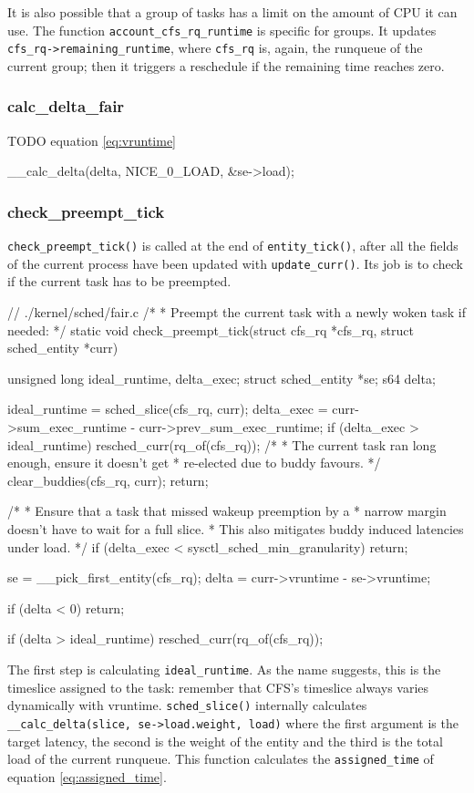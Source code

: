 It is also possible that a group of tasks has a limit on the amount of CPU it can use. The function \verb|account_cfs_rq_runtime| is specific for groups. It updates \verb|cfs_rq->remaining_runtime|, where \verb|cfs_rq| is, again, the runqueue of the current group; then it triggers a reschedule if the remaining time reaches zero.

\subsubsection{calc\_delta\_fair}TODO
equation \ref{eq:vruntime}
\begin{code}
__calc_delta(delta, NICE_0_LOAD, &se->load);
\end{code}
\subsubsection{check\_preempt\_tick} %

\verb|check_preempt_tick()| is called at the end of \verb|entity_tick()|, after all the fields of the current process have been updated with \verb|update_curr()|. Its job is to check if the current task has to be preempted. 
\begin{code}
// ./kernel/sched/fair.c
/*
 * Preempt the current task with a newly woken task if needed:
 */
static void
check_preempt_tick(struct cfs_rq *cfs_rq, struct sched_entity *curr)
{
	unsigned long ideal_runtime, delta_exec;
	struct sched_entity *se;
	s64 delta;

	ideal_runtime = sched_slice(cfs_rq, curr);
	delta_exec = curr->sum_exec_runtime - curr->prev_sum_exec_runtime;
	if (delta_exec > ideal_runtime) {
		resched_curr(rq_of(cfs_rq));
		/*
		 * The current task ran long enough, ensure it doesn't get
		 * re-elected due to buddy favours.
		 */
		clear_buddies(cfs_rq, curr);
		return;
	}

	/*
	 * Ensure that a task that missed wakeup preemption by a
	 * narrow margin doesn't have to wait for a full slice.
	 * This also mitigates buddy induced latencies under load.
	 */
	if (delta_exec < sysctl_sched_min_granularity)
		return;

	se = __pick_first_entity(cfs_rq);
	delta = curr->vruntime - se->vruntime;

	if (delta < 0)
		return;

	if (delta > ideal_runtime)
		resched_curr(rq_of(cfs_rq));
}
\end{code}
The first step is calculating \verb|ideal_runtime|. As the name suggests, this is the timeslice assigned to the task: remember that CFS's timeslice always varies dynamically with vruntime. \verb|sched_slice()| internally calculates \newline \verb|__calc_delta(slice, se->load.weight, load)| where the first argument is the target latency, the second is the weight of the entity and the third is the total load of the current runqueue. This function calculates the \verb|assigned_time| of equation \ref{eq:assigned_time}.

